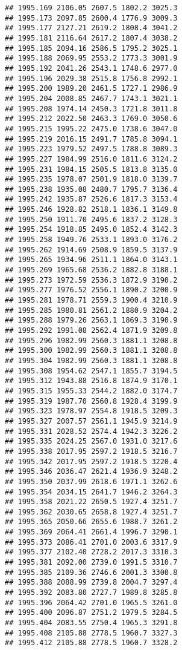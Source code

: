 \documentclass[
]{article}
\begin{document}
\begin{verbatim}
## 1995.169 2106.05 2607.5 1802.2 3025.3
## 1995.173 2097.85 2600.4 1776.9 3009.3
## 1995.177 2127.21 2619.2 1808.4 3041.2
## 1995.181 2116.64 2617.2 1807.4 3038.2
## 1995.185 2094.16 2586.5 1795.2 3025.1
## 1995.188 2069.95 2553.2 1773.3 3001.9
## 1995.192 2041.26 2543.1 1748.6 2977.0
## 1995.196 2029.38 2515.8 1756.8 2992.1
## 1995.200 1989.20 2461.5 1727.1 2986.9
## 1995.204 2008.85 2467.7 1743.1 3021.1
## 1995.208 1974.14 2450.3 1721.8 3011.8
## 1995.212 2022.50 2463.3 1769.0 3050.6
## 1995.215 1995.22 2475.0 1738.6 3047.0
## 1995.219 2016.15 2491.7 1785.8 3094.1
## 1995.223 1979.52 2497.5 1788.8 3089.3
## 1995.227 1984.99 2516.0 1811.6 3124.2
## 1995.231 1984.15 2505.5 1813.8 3135.0
## 1995.235 1978.07 2501.9 1818.0 3139.7
## 1995.238 1935.08 2480.7 1795.7 3136.4
## 1995.242 1935.87 2526.6 1817.3 3153.4
## 1995.246 1928.82 2518.1 1836.1 3149.8
## 1995.250 1911.70 2495.6 1837.2 3128.3
## 1995.254 1918.85 2495.0 1852.4 3142.3
## 1995.258 1949.76 2533.1 1893.0 3176.2
## 1995.262 1914.69 2508.9 1859.5 3137.9
## 1995.265 1934.96 2511.1 1864.0 3143.1
## 1995.269 1965.68 2536.2 1882.8 3188.1
## 1995.273 1972.59 2536.3 1872.9 3190.2
## 1995.277 1976.52 2556.1 1890.2 3200.9
## 1995.281 1978.71 2559.3 1900.4 3210.9
## 1995.285 1980.81 2561.2 1880.9 3204.2
## 1995.288 1979.26 2563.1 1869.3 3190.9
## 1995.292 1991.08 2562.4 1871.9 3209.8
## 1995.296 1982.99 2560.3 1881.1 3208.8
## 1995.300 1982.99 2560.3 1881.1 3208.8
## 1995.304 1982.99 2560.3 1881.1 3208.8
## 1995.308 1954.62 2547.1 1855.7 3194.5
## 1995.312 1943.88 2516.8 1874.9 3170.1
## 1995.315 1955.33 2544.2 1882.0 3174.7
## 1995.319 1987.70 2560.8 1928.4 3199.9
## 1995.323 1978.97 2554.8 1918.5 3209.3
## 1995.327 2007.57 2561.1 1945.9 3214.9
## 1995.331 2028.52 2574.4 1942.3 3226.2
## 1995.335 2024.25 2567.0 1931.0 3217.6
## 1995.338 2017.95 2597.2 1918.5 3216.7
## 1995.342 2017.95 2597.2 1918.5 3220.4
## 1995.346 2036.47 2621.4 1936.9 3248.2
## 1995.350 2037.99 2618.6 1971.1 3262.6
## 1995.354 2034.15 2641.7 1946.2 3264.3
## 1995.358 2021.22 2650.5 1927.4 3251.7
## 1995.362 2030.65 2658.8 1927.4 3251.7
## 1995.365 2050.66 2655.6 1988.7 3261.2
## 1995.369 2064.41 2661.4 1996.7 3290.1
## 1995.373 2086.41 2701.0 2003.6 3317.9
## 1995.377 2102.40 2728.2 2017.3 3310.3
## 1995.381 2092.00 2739.0 1991.5 3310.7
## 1995.385 2109.36 2746.6 2001.3 3300.8
## 1995.388 2088.99 2739.8 2004.7 3297.4
## 1995.392 2083.80 2727.7 1989.8 3285.8
## 1995.396 2064.42 2701.0 1965.5 3261.0
## 1995.400 2096.87 2751.2 1979.5 3284.5
## 1995.404 2083.55 2750.4 1965.3 3291.8
## 1995.408 2105.88 2778.5 1960.7 3327.3
## 1995.412 2105.88 2778.5 1960.7 3328.2

\end{verbatim}
\end{document}
